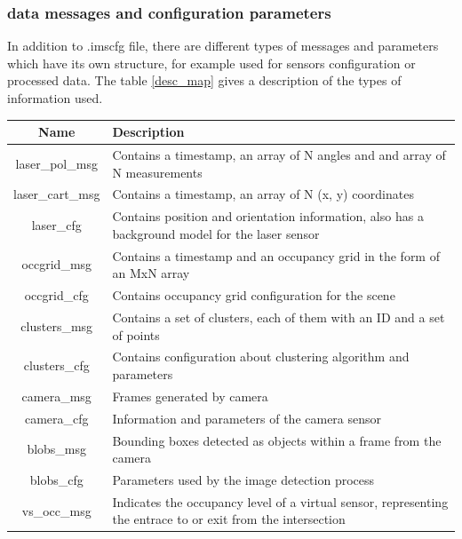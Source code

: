 \subsubsection{data messages and configuration parameters}

In addition to .imscfg file, there are different types of messages and parameters which have its own structure, for example used for sensors configuration or processed data. The table \ref{desc_map} gives a description of the types of information used.

\begin{table}[ht!]
\footnotesize
\centering
\begin{tabular}{|c | p{8cm}|}
\hline
\textbf{Name} & \textbf{Description} \\
\hline
laser\_pol\_msg & Contains a timestamp, an array of N angles and and array of N measurements \\
\hline
laser\_cart\_msg & Contains a timestamp, an array of N (x, y) coordinates \\
\hline
laser\_cfg & Contains position and orientation information, also has a background model for the laser sensor \\
\hline
occgrid\_msg & Contains a timestamp and an occupancy grid in the form of an MxN array \\
\hline
occgrid\_cfg & Contains occupancy grid configuration for the scene \\
\hline
clusters\_msg & Contains a set of clusters, each of them with an ID and a set of points \\
\hline

clusters\_cfg & Contains configuration about clustering algorithm and parameters \\
\hline

camera\_msg & Frames generated by camera \\
\hline

camera\_cfg & Information and parameters of the camera sensor \\
\hline

blobs\_msg & Bounding boxes detected as objects within a frame from the camera \\
\hline

blobs\_cfg & Parameters used by the image detection process\\
\hline

vs\_occ\_msg & Indicates the occupancy level of a virtual sensor, representing the entrace to or exit from the intersection\\
\hline


\end{tabular}
\end{table}
